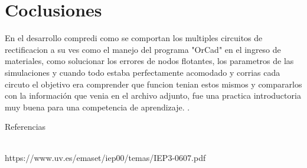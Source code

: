 \documentclass[10pt,a4paper]{article}
\begin{document}
\newpage
\section{Coclusiones}
En el desarrollo compredi como se comportan los multiples circuitos de rectificacion a su ves como el manejo  del programa "OrCad" en el ingreso de materiales, como solucionar los errores de nodos flotantes, los parametros de las simulaciones y cuando todo estaba perfectamente acomodado y corrias cada circuto el objetivo era comprender que funcion tenian estos mismos y compararlos con la información que venia en el archivo adjunto, fue una practica introductoria muy buena para una competencia de aprendizaje.
.

\pagebreak
\begin{LARGE}
Referencias\\\\
\end{LARGE}
{https://www.uv.es/emaset/iep00/temas/IEP3-0607.pdf}

\end{document}

